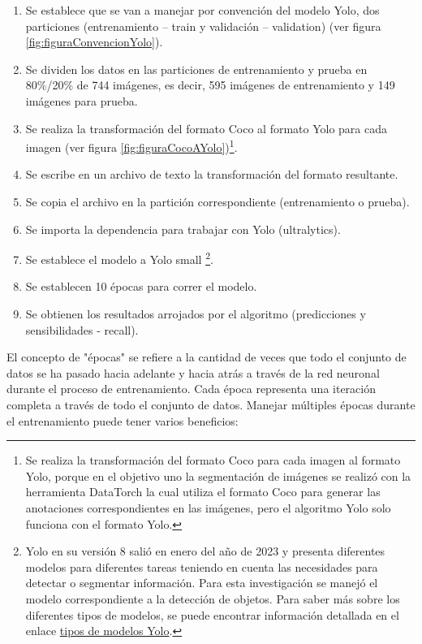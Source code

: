 \begin{enumerate}
    \item Se establece que se van a manejar por convención del modelo Yolo, dos particiones (entrenamiento – train y validación – validation) (ver figura \ref{fig:figuraConvencionYolo}).
    \item Se dividen los datos en las particiones de entrenamiento y prueba en 80\%/20\% de 744 imágenes, es decir, 595 imágenes de entrenamiento y 149 imágenes para prueba.
    \item Se realiza la transformación del formato Coco al formato Yolo para cada imagen  (ver figura \ref{fig:figuraCocoAYolo})\footnote{Se realiza la transformación del formato Coco para cada imagen al formato Yolo, porque en el objetivo uno la segmentación de imágenes se realizó con la herramienta DataTorch la cual utiliza el formato Coco para generar las anotaciones correspondientes en las imágenes, pero el algoritmo Yolo solo funciona con el formato Yolo.}.
    \item Se escribe en un archivo de texto la transformación del formato resultante.
    \item Se copia el archivo en la partición correspondiente (entrenamiento o prueba).
    \item Se importa la dependencia para trabajar con Yolo (ultralytics).
    \item Se establece el modelo a Yolo small \footnote{Yolo en su versión 8 salió en enero del año de 2023 y presenta diferentes modelos para diferentes tareas teniendo en cuenta las necesidades para detectar o segmentar información. Para esta investigación se manejó el modelo correspondiente a la detección de objetos. Para saber más sobre los diferentes tipos de modelos, se puede encontrar información detallada en el enlace \href{https://docs.ultralytics.com/es/models/yolov8/\#tareas-y-modos-compatibles}{tipos de modelos Yolo}. }. 
    \item Se establecen 10 épocas para correr el modelo.
    \item Se obtienen los resultados arrojados por el algoritmo (predicciones y sensibilidades - recall).
\end{enumerate}

El concepto de "épocas" se refiere a la cantidad de veces que todo el conjunto de datos se ha pasado hacia adelante y hacia atrás a través de la red neuronal durante el proceso de entrenamiento. Cada época representa una iteración completa a través de todo el conjunto de datos.
Manejar múltiples épocas durante el entrenamiento puede tener varios beneficios:

